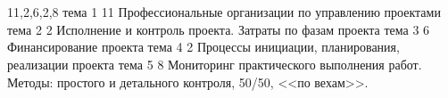\section{}
11,2,6,2,8
тема 1
11 Профессиональные организации по управлению проектами
тема 2
2 Исполнение и контроль проекта. Затраты по фазам проекта
тема 3
6 Финансирование проекта
тема 4
2 Процессы инициации, планирования, реализации проекта
тема 5
8 Мониторинг практического выполнения работ. Методы: простого и детального контроля, 50/50, <<по вехам>>.